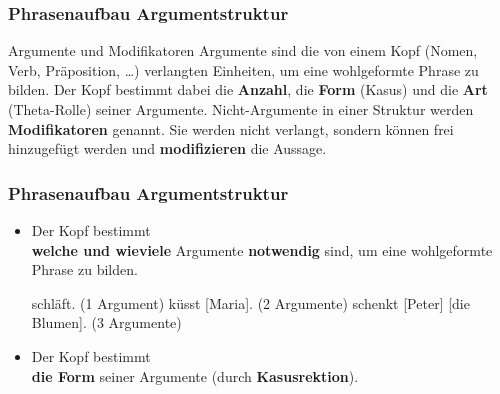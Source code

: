 \begin{frame}
\frametitle{Phrasenaufbau \ras Argumentstruktur}

\begin{block}{Argumente und Modifikatoren}
Argumente sind die von einem Kopf (Nomen, Verb, Präposition, \dots ) verlangten Einheiten, um eine wohlgeformte Phrase zu bilden. Der Kopf bestimmt dabei die \textbf{Anzahl}, die \textbf{Form} (\zB Kasus) und die \textbf{Art} (\zB Theta-Rolle) seiner Argumente. Nicht-Argumente in einer Struktur werden \textbf{Modifikatoren} genannt. Sie werden nicht verlangt, sondern können frei hinzugefügt werden und \textbf{modifizieren} die Aussage. 
\end{block}

\end{frame}


\begin{frame}
\frametitle{Phrasenaufbau \ras Argumentstruktur}

\begin{itemize}
	\item Der Kopf bestimmt\\ 
	\textbf{welche und wieviele} Argumente \textbf{notwendig} sind, um eine wohlgeformte Phrase zu bilden.


\eal 
\ex [Peter] schläft. \hfill (1 Argument)
\ex [Peter] küsst [Maria]. \hfill (2 Argumente)
\ex [Maria] schenkt [Peter] [die Blumen]. \hfill (3 Argumente)
\zl

\pause

\eal
{}
\zl


\end{itemize}
\end{frame}


\begin{frame}

\begin{itemize}
	\item Der Kopf bestimmt\\ 
	\textbf{die Form} seiner Argumente (\zB durch \textbf{Kasusrektion}).
\end{itemize}

\eal 
{}
\zl

\pause

\eal
{}
\zl

\end{frame}


